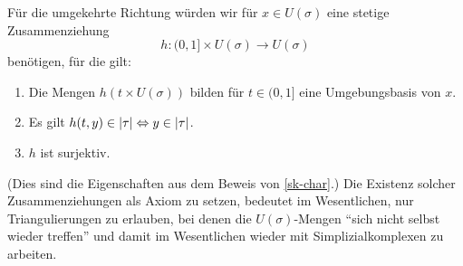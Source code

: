\begin{bem}
  Für die umgekehrte Richtung würden wir für $x \in
  U(\sigma)$ eine stetige Zusammenziehung
  \[ h: (0, 1] \times U(\sigma) \to U(\sigma) \]
  benötigen, für die gilt:
  \begin{enumerate}
  \item Die Mengen $h({t} \times U(\sigma))$ bilden für $t \in (0, 1]$
    eine Umgebungsbasis von $x$.
  \item Es gilt $h(t, y) \in |\tau| \Leftrightarrow y \in |\tau|$.
  \item $h$ ist surjektiv.
  \end{enumerate}
  (Dies sind die Eigenschaften aus dem Beweis von \ref{sk-char}.)  Die
  Existenz solcher Zusammenziehungen als Axiom zu setzen, bedeutet im
  Wesentlichen, nur Triangulierungen zu erlauben, bei denen die
  $U(\sigma)$-Mengen ``sich nicht selbst wieder treffen'' und damit im
  Wesentlichen wieder mit Simplizialkomplexen zu arbeiten.
\end{bem}


